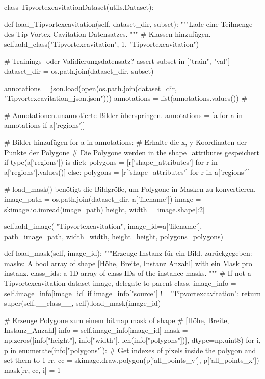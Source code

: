 class TipvortexcavitationDataset(utils.Dataset):

    def load_Tipvortexcavitation(self, dataset_dir, subset):
        """Lade eine Teilmenge des Tip Vortex Cavitation-Datensatzes.
        """
        # Klassen hinzufügen.  
        self.add_class("Tipvortexcavitation", 1, "Tipvortexcavitation")

        # Trainings- oder Validierungsdatensatz?
        assert subset in ["train", "val"]
        dataset_dir = os.path.join(dataset_dir, subset)

       
        annotations = json.load(open(os.path.join(dataset_dir, "Tipvortexcavitation_json.json")))
        annotations = list(annotations.values())  # 

        
        # Annotationen.unannotierte Bilder überspringen.
        annotations = [a for a in annotations if a['regions']]

        # Bilder hinzufügen
        for a in annotations:
            # Erhalte die x, y Koordinaten der Punkte der Polygone
            # Die Polygone werden in the shape_attributes gespeichert
            if type(a['regions']) is dict:
                polygons = [r['shape_attributes'] for r in a['regions'].values()]
            else:
                polygons = [r['shape_attributes'] for r in a['regions']] 

            # load_mask() benötigt die Bildgröße, um Polygone in Masken zu konvertieren.
            image_path = os.path.join(dataset_dir, a['filename'])
            image = skimage.io.imread(image_path)
            height, width = image.shape[:2]

            self.add_image(
                "Tipvortexcavitation",
                image_id=a['filename'],  
                path=image_path,
                width=width, height=height,
                polygons=polygons)

    def load_mask(self, image_id):
        """Erzeuge Instanz  für ein Bild.
       zurückgegeben:
        masks: A bool array of shape [Höhe, Breite, Instanz Anzahl] with
            ein Mask pro instanz.
        class_ids: a 1D array of class IDs of the instance masks.
        """
        # If not a Tipvortexcavitation dataset image, delegate to parent class.
        image_info = self.image_info[image_id]
        if image_info["source"] != "Tipvortexcavitation":
            return super(self.__class__, self).load_mask(image_id)

        # Erzeuge Polygone zum einem bitmap mask of shape
        # [Höhe, Breite, Instanz_Anzahl]
        info = self.image_info[image_id]
        mask = np.zeros([info["height"], info["width"], len(info["polygons"])],
                        dtype=np.uint8)
        for i, p in enumerate(info["polygons"]):
            # Get indexes of pixels inside the polygon and set them to 1
            rr, cc = skimage.draw.polygon(p['all_points_y'], p['all_points_x'])
            mask[rr, cc, i] = 1

